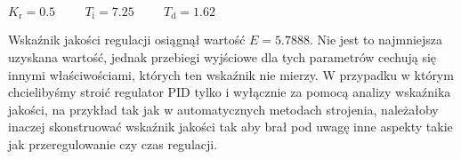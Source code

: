 \begin{center}
    $K_{\mathrm{r}} = \num{0,5} \mathrm{\hspace{1cm}}T_{\mathrm{i}} = \num{7,25} \mathrm{\hspace{1cm}} T_{\mathrm{d}} = \num{1,62}$
\end{center}

Wskaźnik jakości regulacji osiągnął wartość $E = \num{5,7888}$. Nie jest to najmniejsza 
uzyskana wartość, jednak przebiegi wyjściowe dla tych parametrów cechują się innymi właściwościami,
których ten wskaźnik nie mierzy. W przypadku w którym chcielibyśmy stroić regulator PID tylko i wyłącznie
za pomocą analizy wskaźnika jakości, na przykład tak jak w automatycznych metodach strojenia, należałoby
inaczej skonstruować wskaźnik jakości tak aby brał pod uwagę inne aspekty takie jak przeregulowanie czy czas
regulacji.